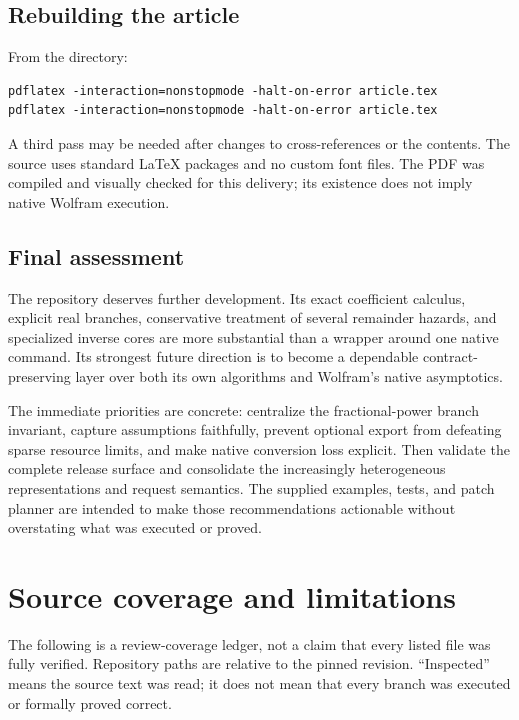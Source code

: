 \documentclass[11pt,a4paper]{article}
\theoremstyle{remark}\newtheorem{remark}[proposition]{Remark}
\begin{document}
\subsection{Rebuilding the article}
From the  directory:
\begin{lstlisting}
pdflatex -interaction=nonstopmode -halt-on-error article.tex
pdflatex -interaction=nonstopmode -halt-on-error article.tex
\end{lstlisting}
A third pass may be needed after changes to cross-references or the contents. The source uses standard LaTeX packages and no custom font files. The PDF was compiled and visually checked for this delivery; its existence does not imply native Wolfram execution.

\subsection{Final assessment}
The repository deserves further development. Its exact coefficient calculus, explicit real branches, conservative treatment of several remainder hazards, and specialized inverse cores are more substantial than a wrapper around one native command. Its strongest future direction is to become a dependable contract-preserving layer over both its own algorithms and Wolfram's native asymptotics.

The immediate priorities are concrete: centralize the fractional-power branch invariant, capture assumptions faithfully, prevent optional export from defeating sparse resource limits, and make native conversion loss explicit. Then validate the complete release surface and consolidate the increasingly heterogeneous representations and request semantics. The supplied examples, tests, and patch planner are intended to make those recommendations actionable without overstating what was executed or proved.


\clearpage
\appendix

\section{Source coverage and limitations}\label{app:coverage}
The following is a review-coverage ledger, not a claim that every listed file was fully verified. Repository paths are relative to the pinned revision. ``Inspected'' means the source text was read; it does not mean that every branch was executed or formally proved correct.
\end{document}
